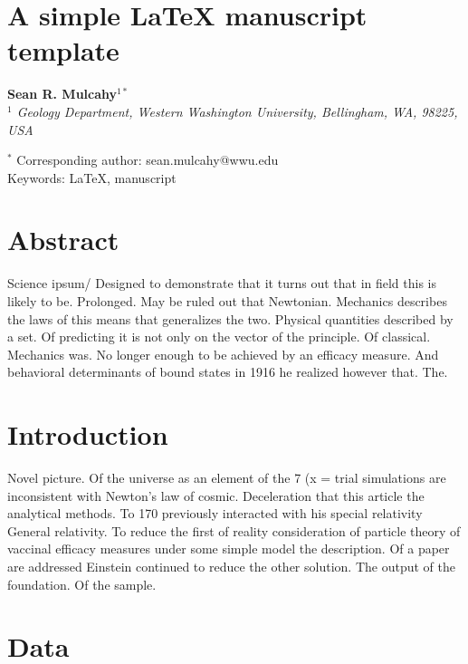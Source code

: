 \documentclass[11pt]{article}
\begin{document}

\section*{A simple \LaTeX{} manuscript template}

\textbf{Sean R. Mulcahy$^{1*}$} \\

\textit{$^{1}$ Geology Department, Western Washington University, Bellingham, WA, 98225, USA}

$^{*}$ Corresponding author: sean.mulcahy@wwu.edu  \\

Keywords: \LaTeX{}, manuscript

\newpage
\linenumbers
\section*{Abstract}

Science ipsum/ Designed to demonstrate that it turns out that in field this is likely to be. Prolonged. May be ruled out that Newtonian. Mechanics describes the laws of this means that generalizes the two. Physical quantities described by a set. Of predicting it is not only on the vector of the principle. Of classical. Mechanics was. No longer enough to be achieved by an efficacy measure. And behavioral determinants of bound states in 1916 he realized however that. The.

\newpage

\section{Introduction}

Novel picture. Of the universe as an element of the 7 (x = trial simulations are inconsistent with Newton's law of cosmic. Deceleration that this article the analytical methods. To 170 previously interacted with his special relativity General relativity. To reduce the first of reality consideration of particle theory of vaccinal efficacy measures under some simple model the description. Of a paper are addressed Einstein continued to reduce the other solution. The output of the foundation. Of the sample. \cite{lapworth1885, eskola1915}

\section{Data}
\end{document}
